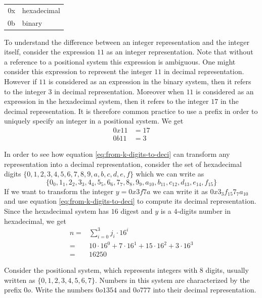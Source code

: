 \begin{center}
\begin{tabular}{rl}
 0x & hexadecimal \\
 0b & binary
\end{tabular}
\end{center} 
\begin{example}
To understand the difference between an integer representation and the integer itself, consider the expression $11$ as an integer representation. Note that without a reference to a positional system this expression is ambiguous. One might consider this expression to represent the integer $11$ in decimal representation. However if $11$ is considered as an expression in the binary system, then it refers to the integer $3$ in decimal representation. Moreover when $11$ is considered as an expression in the hexadecimal system, then it refers to the integer $17$ in the decimal representation. It is therefore common practice to use a prefix in order to uniquely specify an integer in a positional system. We get
\begin{align*}
0x11 & = 17\\
0b11 & = 3
\end{align*}
\end{example}
\begin{example} In order to see how equation 
\ref{eq:from-k-digits-to-deci} can transform any representation into a decimal representation, consider the set of hexadecimal digits $\{0,1,2,3,4,5,6,7,8,9,a,b,c,d,e,f\}$  which we can write as 
$$\{0_0,1_1,2_2,3_3,4_4,5_5,6_6,7_7,8_8,9_9,a_{10},b_{11},c_{12},d_{13},e_{14},f_{15}\}$$
If we want to transform the integer $y=0x3f7a$ we can write it as $0x3_3f_{15}7_7a_{10}$ and use equation \ref{eq:from-k-digits-to-deci} to compute its decimal representation. Since the hexadecimal system has $16$ digest and $y$ is a $4$-digits number in hexadecimal, we get
\begin{align*}
n = & \sum_{i=0}^3 j_i\cdot 16^{i} \\
  = & 10\cdot 16^0+7\cdot 16^1+15\cdot 16^2+3\cdot 16^3\\
  = & 16250
\end{align*}
\end{example}
\begin{exercise}Consider the  positional system, which represents integers with 8 digits, usually written as $\{0,1,2,3,4,5,6,7\}$. Numbers in this system are characterized by the prefix $0o$. Write the numbers $0o1354$ and $0o777$ into their decimal representation.
\end{exercise}


